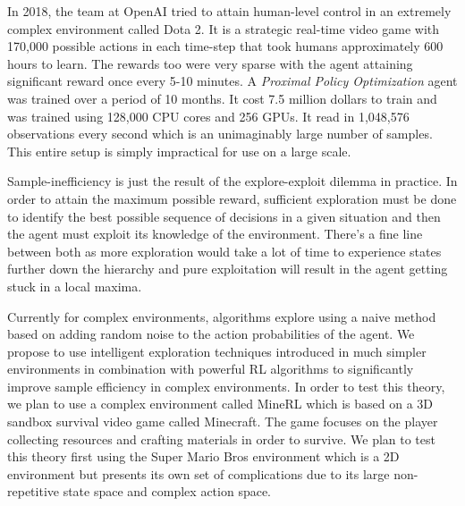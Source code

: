 \documentclass[12pt,a4paper]{article}
\begin{document}
In 2018, the team at OpenAI tried to attain human-level control in an extremely 
complex environment called Dota 2. It is a strategic real-time video game with 
170,000 possible actions in each time-step that took humans approximately 600 
hours to learn. The rewards too were very sparse with the agent attaining 
significant reward once every 5-10 minutes. A \textit{Proximal Policy Optimization} 
agent was trained over a period of 10 months. It cost 7.5 million dollars to 
train and was trained using 128,000 CPU cores and 256 GPUs. It read in 1,048,576 
observations every second which is an unimaginably large number of samples. This 
entire setup is simply impractical for use on a large scale.

Sample-inefficiency is just the result of the explore-exploit dilemma 
in practice. In order to attain the maximum possible reward, sufficient
exploration must be done to identify the best possible sequence of decisions
in a given situation and then the agent must exploit its knowledge of the environment. There's a fine line between both as more exploration
would take a lot of time to experience states further down the hierarchy and pure 
exploitation will result in the agent getting stuck in a local maxima. 

Currently for complex environments, algorithms explore using a naive method 
based on adding random noise to the action probabilities of the agent. We propose 
to use intelligent exploration techniques introduced in much simpler environments in combination with powerful RL algorithms to significantly improve sample efficiency in complex environments. In order to test this theory, we plan to use a complex environment called MineRL which is based on a 3D sandbox survival video game
called Minecraft. The game focuses on the player collecting resources and crafting 
materials in order to survive. We plan to test this theory first using the Super 
Mario Bros environment which is a 2D environment but presents its own set of 
complications due to its large non-repetitive state space and complex action space.
\end{document}
